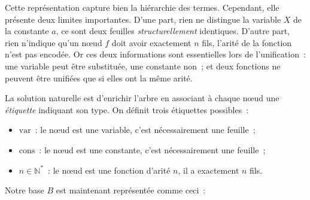 \documentclass[11pt]{article}
\begin{document}
\vspace{0.2cm}
Cette représentation capture bien la hiérarchie des termes. Cependant, elle 
présente deux limites importantes. D'une part, rien ne distingue la variable 
$X$ de la constante $a$, ce sont deux feuilles \textit{structurellement} identiques. 
D'autre part, rien n'indique qu'un nœud $f$ doit avoir exactement $n$ fils, 
l'arité de la fonction n'est pas encodée. Or ces deux informations sont 
essentielles lors de l'unification~: une variable peut être substituée, une 
constante non~; et deux fonctions ne peuvent être unifiées que si elles ont 
la même arité.

\vspace{0.4cm}
La solution naturelle est d'enrichir l'arbre en associant à chaque nœud une 
\textit{étiquette} indiquant son type. On définit trois étiquettes possibles~:

\begin{itemize}
    \item $\text{var}$~: le nœud est une variable, c'est nécessairement 
    une feuille~;
    \item $\text{cons}$~: le nœud est une constante, c'est nécessairement 
    une feuille~;
    \item $n \in \mathbb{N}^*$~: le nœud est une fonction d'arité $n$, 
    il a exactement $n$ fils.
\end{itemize}

\vspace{0.2cm}
Notre base $B$ est maintenant représentée comme ceci~:
\end{document}
